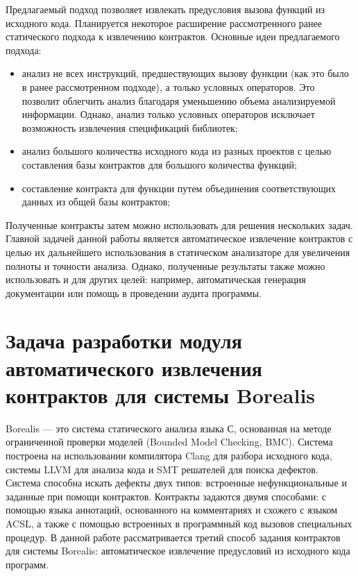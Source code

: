 Предлагаемый подход позволяет извлекать предусловия вызова функций из исходного кода. Планируется некоторое расширение рассмотренного ранее статического подхода к извлечению контрактов\cite{staticPredicateMining}. Основные идеи предлагаемого подхода:
\begin{itemize}
\item анализ не всех инструкций, предшествующих вызову функции (как это было в ранее рассмотренном подходе), а только условных операторов. Это позволит облегчить анализ благодаря уменьшению объема анализируемой информации. Однако, анализ только условных операторов исключает возможность извлечения спецификаций библиотек;
\item анализ большого количества исходного кода из разных проектов с целью составления базы контрактов для большого количества функций;
\item составление контракта для функции путем объединения соответствующих данных из общей базы контрактов;
\end{itemize}

Полученные контракты затем можно использовать для решения нескольких задач. Главной задачей данной работы является автоматическое извлечение контрактов с целью их дальнейшего использования в статическом анализаторе для увеличения полноты и точности анализа. Однако, полученные результаты также можно использовать и для других целей: например, автоматическая генерация документации или помощь в проведении аудита программы.

\section{Задача разработки модуля автоматического извлечения контрактов для системы Borealis}
Borealis --- это система статического анализа языка С, основанная на методе ограниченной проверки моделей (Bounded Model Checking, BMC)\cite{bmc}. Система построена на использовании компилятора Clang\cite{clang} для разбора исходного кода, системы LLVM\cite{llvm} для анализа кода и SMT решателей для поиска дефектов. Система способна искать дефекты двух типов: встроенные нефункциональные и заданные при помощи контрактов. Контракты задаются двумя способами: с помощью языка аннотаций, основанного на комментариях и схожего с языком ACSL, а также с помощью встроенных в программный код вызовов специальных процедур. В данной работе рассматривается третий способ задания контрактов для системы Borealis: автоматическое извлечение предусловий из исходного кода программ.

